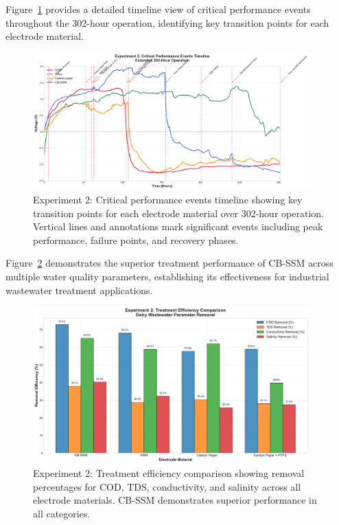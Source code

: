 \documentclass[12pt,a4paper]{article}
\begin{document}
Figure~\ref{fig:timeline_analysis_exp2} provides a detailed timeline view of critical performance events throughout the 302-hour operation, identifying key transition points for each electrode material.

\begin{figure}[htbp]
\centering
\includegraphics[width=0.95\textwidth]{experiment_2_timeline_analysis.pdf}
\caption{Experiment 2: Critical performance events timeline showing key transition points for each electrode material over 302-hour operation. Vertical lines and annotations mark significant events including peak performance, failure points, and recovery phases.}
\label{fig:timeline_analysis_exp2}
\end{figure}

Figure~\ref{fig:treatment_efficiency_exp2} demonstrates the superior treatment performance of CB-SSM across multiple water quality parameters, establishing its effectiveness for industrial wastewater treatment applications.

\begin{figure}[htbp]
\centering
\includegraphics[width=0.95\textwidth]{experiment_2_treatment_efficiency.pdf}
\caption{Experiment 2: Treatment efficiency comparison showing removal percentages for COD, TDS, conductivity, and salinity across all electrode materials. CB-SSM demonstrates superior performance in all categories.}
\label{fig:treatment_efficiency_exp2}
\end{figure}
\end{document}
